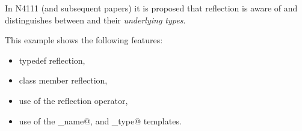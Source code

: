 In N4111 (and subsequent papers) it is proposed that reflection
is aware of \verb@typedef@s and distinguishes between
\verb@typedef@s and their {\em underlying types}.

This example shows the following features:

\begin{itemize}
\item{typedef reflection,}
\item{class member reflection,}
\item{use of the reflection operator,}
\item{use of the \verb@base_name@, \verb@type@ and \verb@original_type@ templates. }
\end{itemize}

